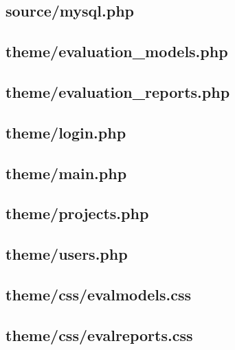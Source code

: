 \documentclass[12pt,a4paper,titlepage,spanish,twoside]{book}
\begin{document}
\subsection{source/mysql.php}



\subsection{theme/evaluation\_models.php}


\subsection{theme/evaluation\_reports.php}


\subsection{theme/login.php}


\subsection{theme/main.php}


\subsection{theme/projects.php}


\subsection{theme/users.php}


\subsection{theme/css/evalmodels.css}


\subsection{theme/css/evalreports.css}

\end{document}

